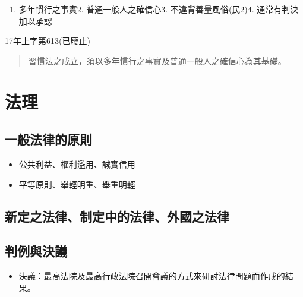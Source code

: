 \documentclass[
]{book}
\providecommand{\tightlist}{%
  \setlength{\itemsep}{0pt}\setlength{\parskip}{0pt}}
\begin{document}
\begin{enumerate}
\def\labelenumi{\arabic{enumi}.}
\tightlist
\item
  多年慣行之事實2. 普通一般人之確信心3. 不違背善量風俗(民2)4. 通常有判決加以承認
\end{enumerate}

17年上字第613(已廢止)

\begin{quote}
習慣法之成立，須以多年慣行之事實及普通一般人之確信心為其基礎。
\end{quote}

\hypertarget{ux6cd5ux7406}{%
\section{法理}\label{ux6cd5ux7406}}

\hypertarget{ux4e00ux822cux6cd5ux5f8bux7684ux539fux5247}{%
\subsection{一般法律的原則}\label{ux4e00ux822cux6cd5ux5f8bux7684ux539fux5247}}

\begin{itemize}
\item
  公共利益、權利濫用、誠實信用
\item
  平等原則、舉輕明重、舉重明輕
\end{itemize}

\hypertarget{ux65b0ux5b9aux4e4bux6cd5ux5f8bux5236ux5b9aux4e2dux7684ux6cd5ux5f8bux5916ux570bux4e4bux6cd5ux5f8b}{%
\subsection{新定之法律、制定中的法律、外國之法律}\label{ux65b0ux5b9aux4e4bux6cd5ux5f8bux5236ux5b9aux4e2dux7684ux6cd5ux5f8bux5916ux570bux4e4bux6cd5ux5f8b}}

\pagebreak

\hypertarget{ux5224ux4f8bux8207ux6c7aux8b70}{%
\subsection{判例與決議}\label{ux5224ux4f8bux8207ux6c7aux8b70}}

\begin{itemize}
\tightlist
\item
  決議：最高法院及最高行政法院召開會議的方式來研討法律問題而作成的結果。
\end{itemize}
\end{document}
